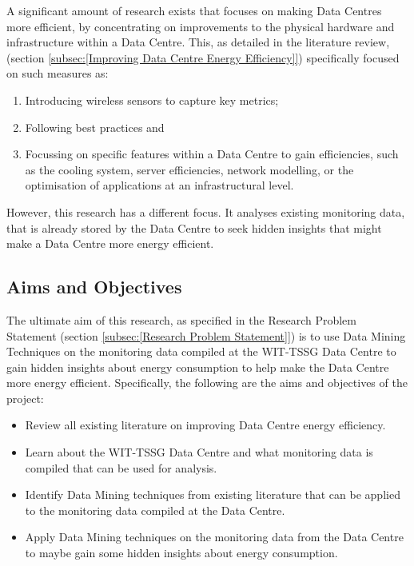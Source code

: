 \documentclass[12pt]{scrartcl}
\begin{document}
A significant amount of research exists that focuses on making Data Centres more efficient, by concentrating on improvements to the physical hardware and infrastructure within a Data Centre. This, as detailed in the literature review, (section \ref{subsec:[Improving Data Centre Energy Efficiency]}) specifically focused on such measures as: 

\begin{enumerate}
	\item Introducing wireless sensors to capture key metrics;
	\item Following best practices and 
	\item Focussing on specific features within a Data Centre to gain efficiencies, such as the cooling system, server efficiencies, network modelling, or the optimisation of applications at an infrastructural level. 
\end{enumerate}

However, this research has a different focus. It analyses existing monitoring data, that is already stored by the Data Centre to seek hidden insights that might make a Data Centre more energy efficient. 

\subsection{Aims and Objectives}
\label{subsec:[Aims and Objective]}

The ultimate aim of this research, as specified in the Research Problem Statement (section \ref{subsec:[Research Problem Statement]}) is to use Data Mining Techniques on the monitoring data compiled at the WIT-TSSG Data Centre to gain hidden insights about energy consumption to help make the Data Centre more energy efficient. 
Specifically, the following are the aims and objectives of the project:

\begin{itemize}
\item Review all existing literature on improving Data Centre energy efficiency.
\item Learn about the WIT-TSSG Data Centre and what monitoring data is compiled that can be used for analysis.
\item Identify Data Mining techniques from existing literature that can be applied to the monitoring data compiled at the Data Centre.
\item Apply Data Mining techniques on the monitoring data from the Data Centre to maybe gain some hidden insights about energy consumption.
\end{itemize}
\end{document}
